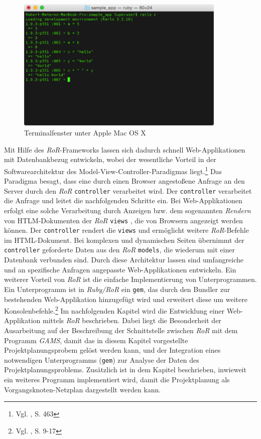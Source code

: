 \documentclass[a4paper,12pt,parskip,bibtotoc,liststotoc]{article}
\begin{document}
\begin{figure}[h!]
  \begin{center}
\includegraphics[width=100mm]{Bilder/Terminal.pdf}
    \caption{Terminalfenster unter Apple Mac OS X}  \label{Terminal}
  \end{center}
\end{figure}

Mit Hilfe des \textit{RoR}-Frameworks lassen sich dadurch schnell Web-Applikationen mit Datenbankbezug entwickeln, wobei der wesentliche Vorteil in der Softwarearchitektur des Model-View-Controller-Paradigmas liegt.\footnote{Vgl. \cite{walter2008ruby}, S. 463} Das Paradigma besagt, dass eine durch einen Browser angestoßene Anfrage an den Server durch den \textit{RoR} \texttt{controller} verarbeitet wird. Der \texttt{controller} verarbeitet die Anfrage und leitet die nachfolgenden Schritte ein. Bei Web-Applikationen erfolgt eine solche Verarbeitung durch Anzeigen bzw. dem sogenannten \textit{Rendern} von HTLM-Dokumenten der \textit{RoR} \texttt{views} , die von Browsern angezeigt werden können. Der \texttt{controller} rendert die \texttt{views} und ermöglicht weitere \textit{RoR}-Befehle im HTML-Dokument. Bei komplexen und dynamischen Seiten übernimmt der \texttt{controller} geforderte Daten aus den \textit{RoR} \texttt{models}, die wiederum mit einer Datenbank verbunden sind. Durch diese Architektur lassen sind umfangreiche und an spezifische Anfragen angepasste Web-Applikationen entwickeln. Ein weiterer Vorteil von \textit{RoR} ist die einfache Implementierung von Unterprogrammen. Ein Unterprogramm ist in \textit{Ruby/RoR} ein \texttt{gem}, das durch den Bundler zur bestehenden Web-Applikation hinzugefügt wird und erweitert diese um weitere Konsolenbefehle.\footnote{Vgl. \cite{hartl2012ruby}, S. 9-17} Im nachfolgenden Kapitel wird die Entwicklung einer Web-Applikation mittels \textit{RoR} beschrieben. Dabei liegt die Besonderheit der Ausarbeitung auf der Beschreibung der Schnittstelle zwischen \textit{RoR} mit dem Programm \textit{GAMS}, damit das in diesem Kapitel vorgestellte Projektplanungsprobem gelöst werden kann, und der Integration eines notwendigen Unterprogramms (\texttt{gem}) zur Analyse der Daten des Projektplanungsproblems. Zusätzlich ist in dem Kapitel beschrieben, inwieweit ein weiteres Programm implementiert wird, damit die Projektplanung als Vorgangsknoten-Netzplan dargestellt werden kann.
\end{document}
